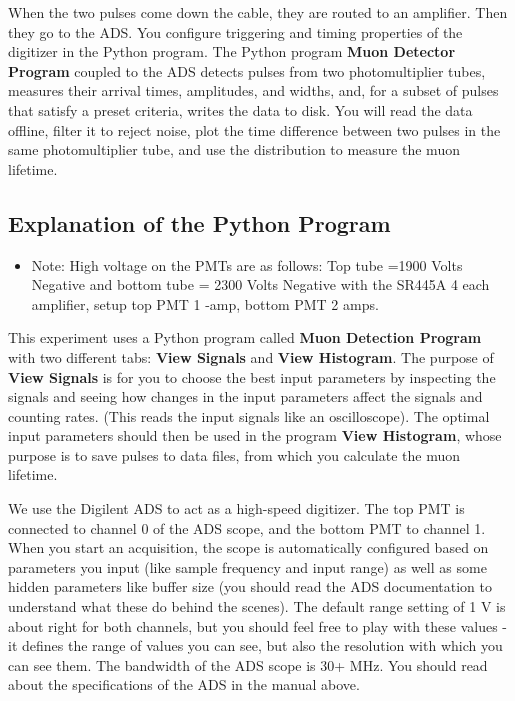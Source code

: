 \documentclass{../lab}
\begin{document}
When the two pulses come down the cable, they are routed to an amplifier. Then they go to the ADS. You configure triggering and timing properties of the digitizer in the Python program. The Python program \textbf{Muon Detector Program} coupled to the ADS detects pulses from two photomultiplier tubes, measures their arrival times, amplitudes, and widths, and, for a subset of pulses that satisfy a preset criteria, writes the data to disk. You will read the data offline, filter it to reject noise, plot the time difference between two pulses in the same photomultiplier tube, and use the distribution to measure the muon lifetime.

\newpage

\subsection{Explanation of the Python Program}

\begin{itemize}
    \item Note: High voltage on the PMTs are as follows: Top tube =1900 Volts Negative and bottom tube = 2300 Volts Negative with the SR445A 4 each amplifier, setup top PMT 1 -amp, bottom PMT 2 amps.

\end{itemize}

This experiment uses a Python program called \textbf{Muon Detection Program} with two different tabs: \textbf{View Signals} and \textbf{View Histogram}. The purpose of \textbf{View Signals} is for you to choose the best input parameters by inspecting the signals and seeing how changes in the input parameters affect the signals and counting rates. (This reads the input signals like an oscilloscope). The optimal input parameters should then be used in the program \textbf{View Histogram}, whose purpose is to save pulses to data files, from which you calculate the muon lifetime.




We use the Digilent ADS to act as a high-speed digitizer. The top PMT is connected to channel 0 of the ADS scope, and the bottom PMT to channel 1. When you start an acquisition, the scope is automatically configured based on parameters you input (like sample frequency and input range) as well as some hidden parameters like buffer size (you should read the ADS documentation to understand what these do behind the scenes). The default range setting of 1 V is about right for both channels, but you should feel free to play with these values - it defines the range of values you can see, but also the resolution with which you can see them. The bandwidth of the ADS scope is 30+ MHz. You should read about the specifications of the ADS in the manual above.
\end{document}
